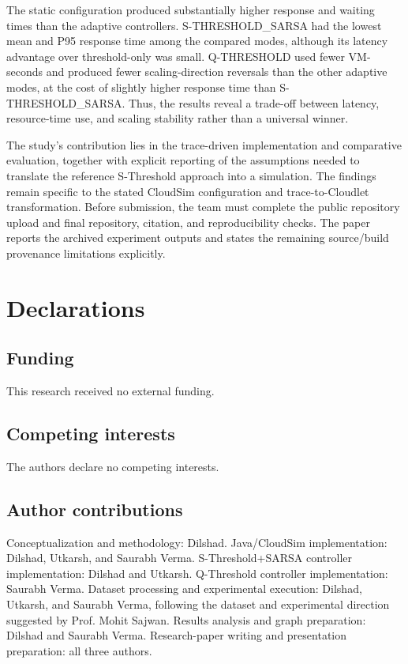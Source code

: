 \documentclass[pdflatex,sn-mathphys-num]{sn-jnl}
\begin{document}
The static configuration produced substantially higher response and waiting times than the adaptive controllers. S-THRESHOLD\_SARSA had the lowest mean and P95 response time among the compared modes, although its latency advantage over threshold-only was small. Q-THRESHOLD used fewer VM-seconds and produced fewer scaling-direction reversals than the other adaptive modes, at the cost of slightly higher response time than S-THRESHOLD\_SARSA. Thus, the results reveal a trade-off between latency, resource-time use, and scaling stability rather than a universal winner.

The study's contribution lies in the trace-driven implementation and comparative evaluation, together with explicit reporting of the assumptions needed to translate the reference S-Threshold approach into a simulation. The findings remain specific to the stated CloudSim configuration and trace-to-Cloudlet transformation. Before submission, the team must complete the public repository upload and final repository, citation, and reproducibility checks. The paper reports the archived experiment outputs and states the remaining source/build provenance limitations explicitly.

\section*{Declarations}

\subsection*{Funding}
This research received no external funding.

\subsection*{Competing interests}
The authors declare no competing interests.

\subsection*{Author contributions}
Conceptualization and methodology: Dilshad. Java/CloudSim implementation: Dilshad, Utkarsh, and Saurabh Verma. S-Threshold+SARSA controller implementation: Dilshad and Utkarsh. Q-Threshold controller implementation: Saurabh Verma. Dataset processing and experimental execution: Dilshad, Utkarsh, and Saurabh Verma, following the dataset and experimental direction suggested by Prof. Mohit Sajwan. Results analysis and graph preparation: Dilshad and Saurabh Verma. Research-paper writing and presentation preparation: all three authors.
\end{document}
